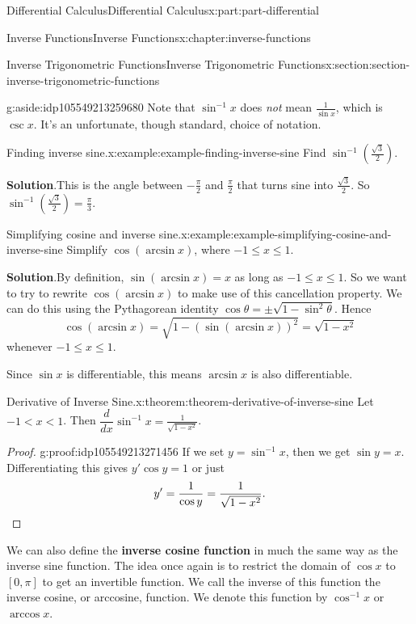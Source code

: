 \documentclass[twoside,10pt,]{book}
\newcommand{\blocktitlefont}{\relax}
\newcommand{\terminology}[1]{\textbf{#1}}
\numberwithin{equation}{part}
\newcommand{\qedhere}{\relax}
\newcommand{\dv}[3][]{\dfrac{d^{#1} #2}{d #3^{#1}}}
\begin{document}
\begin{partptx}{Differential Calculus}{}{Differential Calculus}{}{}{x:part:part-differential}
\begin{chapterptx}{Inverse Functions}{}{Inverse Functions}{}{}{x:chapter:inverse-functions}
\begin{sectionptx}{Inverse Trigonometric Functions}{}{Inverse Trigonometric Functions}{}{}{x:section:section-inverse-trigonometric-functions}
\begin{aside}{}{g:aside:idp105549213259680}
Note that \(\sin^{-1}x\) does \emph{not} mean \(\frac{1}{\sin x}\), which is \(\csc x\). It's an unfortunate, though standard, choice of notation.%
\end{aside}
%
\begin{example}{Finding inverse sine.}{x:example:example-finding-inverse-sine}%
Find \(\sin^{-1}(\frac{\sqrt{3}}{2})\).%
\par\smallskip%
\noindent\textbf{\blocktitlefont Solution}.\hypertarget{g:solution:idp105549213262496}{}\quad{}This is the angle between \(-\frac{\pi}{2}\) and \(\frac{\pi}{2}\) that turns sine into \(\frac{\sqrt{3}}{2}\). So \(\sin^{-1}(\frac{\sqrt{3}}{2}) = \frac{\pi}{3}\).%
\end{example}
\begin{example}{Simplifying cosine and inverse sine.}{x:example:example-simplifying-cosine-and-inverse-sine}%
Simplify \(\cos(\arcsin x)\), where \(-1\leq x\leq 1\).%
\par\smallskip%
\noindent\textbf{\blocktitlefont Solution}.\hypertarget{g:solution:idp105549213266080}{}\quad{}By definition, \(\sin(\arcsin x) = x\) as long as \(-1\leq x\leq 1\). So we want to try to rewrite \(\cos(\arcsin x)\) to make use of this cancellation property. We can do this using the Pythagorean identity \(\cos \theta = \pm\sqrt{1-\sin^{2}\theta}\). Hence%
\begin{equation*}
\cos(\arcsin x) = \sqrt{1-(\sin(\arcsin x))^{2}} = \sqrt{1 - x^{2}}
\end{equation*}
whenever \(-1\leq x\leq 1\).%
\end{example}
Since \(\sin x\) is differentiable, this means \(\arcsin x\) is also differentiable.%
\begin{theorem}{Derivative of Inverse Sine.}{}{x:theorem:theorem-derivative-of-inverse-sine}%
Let \(-1 < x < 1\). Then \(\dv{}{x}\sin^{-1}x = \frac{1}{\sqrt{1-x^{2}}}\).%
\end{theorem}
\begin{proof}{}{g:proof:idp105549213271456}
If we set \(y = \sin^{-1}x\), then we get \(\sin y = x\). Differentiating this gives \(y'\cos y = 1\) or just%
\begin{equation*}
y' = \frac{1}{\cos y} = \frac{1}{\sqrt{1-x^{2}}}.\qedhere
\end{equation*}
%
\end{proof}
We can also define the \terminology{inverse cosine function} in much the same way as the inverse sine function. The idea once again is to restrict the domain of \(\cos x\) to \([0,\pi]\) to get an invertible function. We call the inverse of this function the inverse cosine, or arccosine, function. We denote this function by \(\cos^{-1}x\) or \(\arccos x\).%

\end{sectionptx}
\end{chapterptx}
\end{partptx}
\end{document}
